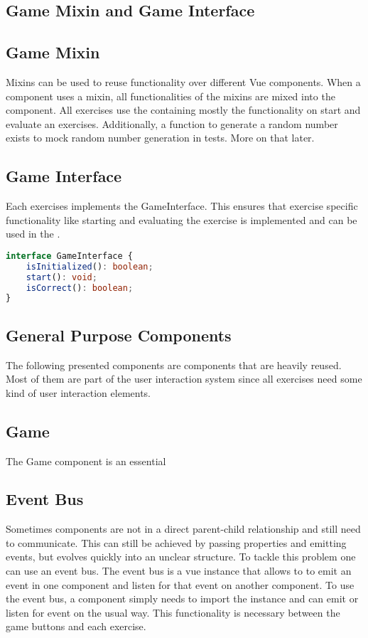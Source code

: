 \subsection{Game Mixin and Game Interface}

\subsection*{Game Mixin}
Mixins can be used to reuse functionality over different Vue components. When a component uses a mixin, all functionalities of the mixins are mixed into the component. All exercises use the  containing mostly the functionality on start and evaluate an exercises. Additionally, a function to generate a random number exists to mock random number generation in tests. More on that later.

\subsection*{Game Interface}
Each exercises implements the GameInterface. This ensures that exercise specific functionality like starting and evaluating the exercise is implemented and can be used in the .

\begin{lstlisting}[language=TypeScript,caption={GameInterface},label={lst:gameInterface}]
interface GameInterface {
    isInitialized(): boolean;
    start(): void;
    isCorrect(): boolean;
}
\end{lstlisting}

\subsection{General Purpose Components}
The following presented components are components that are heavily reused. Most of them are part of the user interaction system since all exercises need some kind of user interaction elements.

\subsection*{Game}
The Game component is an essential

\subsection{Event Bus}
Sometimes components are not in a direct parent-child relationship and still need to communicate. This can still be achieved by passing properties and emitting events, but evolves quickly into an unclear structure. To tackle this problem one can use an event bus. 
The event bus is a vue instance that allows to to emit an event in one component and listen for that event on another component. To use the event bus, a component simply needs to import the instance and can emit or listen for event on the usual way. This functionality is necessary between the game buttons and each exercise.

